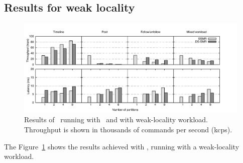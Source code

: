 \subsection{Results for weak locality} \label{sec:dssmr-evaluation:weakloc}

\begin{figure}
\begin{minipage}[b]{1\linewidth}
\centering
      \includegraphics[width=1.08\linewidth]{figures/experiments/dssmr/weak-locality}
\end{minipage}
\caption{Results of \dssmrappname\ running with \ssmr\ and \dssmr{} with weak-locality workload. Throughput is shown in thousands of commands per second (kcps).}
\label{fig:dssmr-weakloc}
\end{figure}

The Figure~\ref{fig:dssmr-weakloc} shows the results achieved with
\dssmrappname{}, running with a weak-locality workload.


